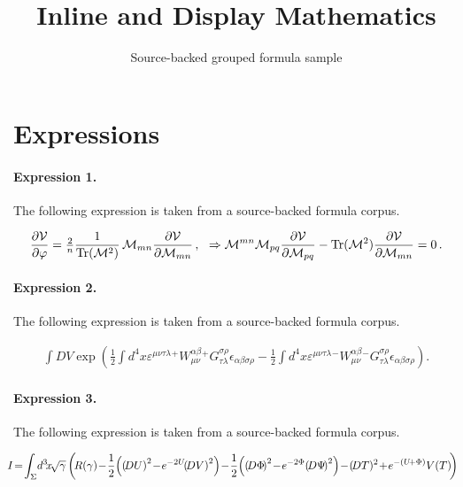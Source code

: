 \documentclass[11pt]{article}
\title{Inline and Display Mathematics}
\author{Source-backed grouped formula sample}
\date{}
\begin{document}
\maketitle
\section{Expressions}
\paragraph{Expression 1.} The following expression is taken from a source-backed formula corpus.

\begin{align*}\frac{\partial {\cal V}}{\partial \varphi} = {\textstyle\frac{2}{n}} \frac{1}{{\rm Tr}({\cal M}^2)}\, {\cal M}_{mn} \frac{\partial {\cal V}}{\partial {\cal M}_{mn}}\, ,\,\,\,\,\Rightarrow {\cal M}^{mn}{\cal M}_{pq} \frac{\partial {\cal V}}{\partial {\cal M}_{pq}} - {\rm Tr}({\cal M}^2) \frac{\partial {\cal V}}{\partial {\cal M}_{mn}} = 0\, .\end{align*}

\paragraph{Expression 2.} The following expression is taken from a source-backed formula corpus.

\begin{align*}\int DV\exp (\frac 12\int d^4x\varepsilon ^{\mu \nu \tau \lambda}{}^{+}W_{\mu \nu }^{\alpha \beta }{}^{+}G_{\tau \lambda }^{\sigma \rho}{}\epsilon _{\alpha \beta \sigma \rho }-\frac 12\int d^4x\varepsilon ^{\mu\nu \tau \lambda }{}^{-}W_{\mu \nu }^{\alpha \beta }{}^{-}G_{\tau \lambda}^{\sigma \rho }{}\epsilon _{\alpha \beta \sigma \rho }). \end{align*}

\paragraph{Expression 3.} The following expression is taken from a source-backed formula corpus.

\begin{align*}\!\!\!\!I\!=\!\int_{\Sigma}\! d^3 \! x \!\sqrt{\gamma}\left(\!R(\gamma)\!-\! {1 \over 2} \!\left( \left(\!DU \right)^2 \!-\! e^{-2U}\!\!\left(\!DV \right)^2 \right) \!-\! {1 \over 2} \!\left(\left(\!D \Phi \!\right)^2 \!-\! e^{- 2 \Phi} \!\left(\!D \Psi \!\right)^2 \right)\!-\! \left(\!D T \right)\!^2 \!+\! e^{-(U\!+\Phi)}V(T) \!\right) \end{align*}
\end{document}
